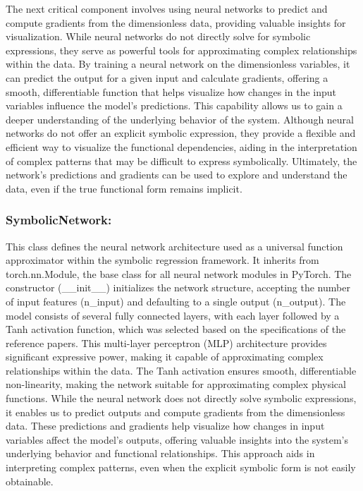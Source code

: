\documentclass{article}
\begin{document}
The next critical component involves using neural networks to predict and compute gradients from the dimensionless data, providing valuable insights for visualization. While neural networks do not directly solve for symbolic expressions, they serve as powerful tools for approximating complex relationships within the data. By training a neural network on the dimensionless variables, it can predict the output for a given input and calculate gradients, offering a smooth, differentiable function that helps visualize how changes in the input variables influence the model’s predictions. This capability allows us to gain a deeper understanding of the underlying behavior of the system. Although neural networks do not offer an explicit symbolic expression, they provide a flexible and efficient way to visualize the functional dependencies, aiding in the interpretation of complex patterns that may be difficult to express symbolically. Ultimately, the network's predictions and gradients can be used to explore and understand the data, even if the true functional form remains implicit.\\







\subsubsection{SymbolicNetwork:}


This class defines the neural network architecture used as a universal function approximator within the symbolic regression framework. It inherits from torch.nn.Module, the base class for all neural network modules in PyTorch. The constructor (__init__) initializes the network structure, accepting the number of input features (n_input) and defaulting to a single output (n_output). The model consists of several fully connected layers, with each layer followed by a Tanh activation function, which was selected based on the specifications of the reference papers. This multi-layer perceptron (MLP) architecture provides significant expressive power, making it capable of approximating complex relationships within the data. The Tanh activation ensures smooth, differentiable non-linearity, making the network suitable for approximating complex physical functions. While the neural network does not directly solve symbolic expressions, it enables us to predict outputs and compute gradients from the dimensionless data. These predictions and gradients help visualize how changes in input variables affect the model's outputs, offering valuable insights into the system's underlying behavior and functional relationships. This approach aids in interpreting complex patterns, even when the explicit symbolic form is not easily obtainable.\\
\end{document}
